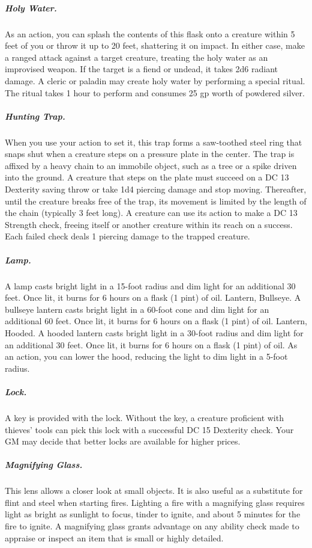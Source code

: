 \subparagraph*{Holy Water.} As an action, you can splash the contents of this flask onto a creature within 5 feet of you or throw it up to 20 feet, shattering it on impact. In either case, make a ranged attack against a target creature, treating the holy water as an improvised weapon. If the target is a fiend or undead, it takes 2d6 radiant damage.
A cleric or paladin may create holy water by performing a special ritual. The ritual takes 1 hour to perform and consumes 25 gp worth of powdered silver.

\subparagraph*{Hunting Trap.} When you use your action to set it, this trap forms a saw-toothed steel ring that snaps shut when a creature steps on a pressure plate in the center. The trap is affixed by a heavy chain to an immobile object, such as a tree or a spike driven into the ground. A creature that steps on the plate must succeed on a DC 13 Dexterity saving throw or take 1d4 piercing damage and stop moving. Thereafter, until the creature breaks free of the trap, its movement is limited by the length of the chain (typically 3 feet long). A creature can use its action to make a DC 13 Strength check, freeing itself or another creature within its reach on a success. Each failed check deals 1 piercing damage to the trapped creature.

\subparagraph*{Lamp.} A lamp casts bright light in a 15-foot radius and dim light for an additional 30 feet. Once lit, it burns for 6 hours on a flask (1 pint) of oil.
Lantern, Bullseye. A bullseye lantern casts bright light in a 60-foot cone and dim light for an additional 60 feet. Once lit, it burns for 6 hours on a flask (1 pint) of oil.
Lantern, Hooded. A hooded lantern casts bright light in a 30-foot radius and dim light for an additional 30 feet. Once lit, it burns for 6 hours on a flask (1 pint) of oil. As an action, you can lower the hood, reducing the light to dim light in a 5-foot radius.

\subparagraph*{Lock.} A key is provided with the lock. Without the key, a creature proficient with thieves' tools can pick this lock with a successful DC 15 Dexterity check. Your GM may decide that better locks are available for higher prices.

\subparagraph*{Magnifying Glass.} This lens allows a closer look at small objects. It is also useful as a substitute for flint and steel when starting fires. Lighting a fire with a magnifying glass requires light as bright as sunlight to focus, tinder to ignite, and about 5 minutes for the fire to ignite. A magnifying glass grants advantage on any ability check made to appraise or inspect an item that is small or highly detailed.

